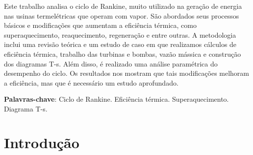\documentclass[
	article,			%
	11pt,				%
	oneside,			%
	a4paper,			%
	english,			%
	brazil,				%
	sumario=tradicional
	]{abntex2}
\begin{document}

\frenchspacing


%
%

\maketitle





\begin{resumoumacoluna}
	Este trabalho analisa o ciclo de Rankine, muito utilizado na geração de energia
	nas usinas termelétricas que operam com vapor. São abordados seus processos
	básicos e modificações que aumentam a eficiência térmica, como superaquecimento,
	reaquecimento, regeneração e entre outras. A metodologia inclui uma revisão teórica
	e um estudo de caso em que realizamos cálculos de eficiência térmica, trabalho das
	turbinas e bombas, vazão mássica e construção dos diagramas T-s. Além disso, é
	realizado uma análise paramétrica do desempenho do ciclo. Os resultados nos
	mostram que tais modificações melhoram a eficiência, mas que é necessário um estudo aprofundado.

 \vspace{\onelineskip}

 \noindent
 \textbf{Palavras-chave}: Ciclo de Rankine. Eficiência térmica. Superaquecimento. Diagrama T-s.
\end{resumoumacoluna}

\textual

\section{Introdução}
\end{document}
